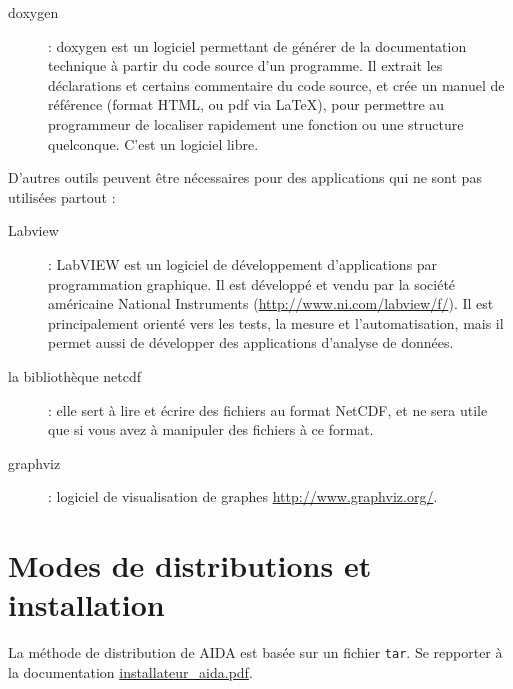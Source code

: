 \begin{description}
  \item[doxygen] : doxygen est un logiciel permettant de générer de la
    documentation technique à partir du code source d'un programme.
    Il extrait les déclarations et certains commentaire du code source,
    et crée un manuel de référence (format HTML, ou pdf via LaTeX),
    pour permettre au programmeur de localiser rapidement une fonction
    ou une structure quelconque. C'est un logiciel libre.

\end{description}

D'autres outils peuvent être nécessaires pour des applications qui ne sont pas
utilisées partout :

\begin{description}
  \item[Labview] : LabVIEW est un logiciel de développement d'applications
    par programmation graphique. Il est développé et vendu par la
    société américaine National Instruments (\url{http://www.ni.com/labview/f/}).
    Il est principalement orienté vers les tests, la mesure et
    l'automatisation, mais il permet aussi de développer des applications
    d'analyse de données.

  \item[la bibliothèque netcdf] : elle sert à lire et écrire des fichiers au
    format NetCDF, et ne sera utile que si vous avez à manipuler des fichiers
    à ce format.

  \item[graphviz] : logiciel de visualisation de graphes
    \url{http://www.graphviz.org/}.

\end{description}


\section{Modes de distributions et installation}

La méthode de distribution de AIDA est basée sur un fichier \texttt{tar}.
Se repporter à la documentation \url{installateur\_aida.pdf}.

